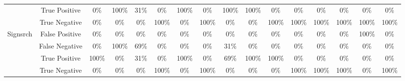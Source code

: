 \begin{table}[htb]
\begin{adjustbox}{max width=\textwidth}
\begin{tabular}{cc|ccccccccc|ccccc}
\multicolumn{1}{c|}{} & \multicolumn{1}{c||}{True Positive} & \multicolumn{1}{c|}{0\%} & \multicolumn{1}{c|}{100\%} & \multicolumn{1}{c|}{31\%} & \multicolumn{1}{c|}{0\%} & \multicolumn{1}{c|}{100\%} & \multicolumn{1}{c|}{0\%} & \multicolumn{1}{c|}{100\%} & \multicolumn{1}{c|}{100\%} & \multicolumn{1}{c|}{0\%} & \multicolumn{1}{c|}{0\%} & \multicolumn{1}{c|}{0\%} & \multicolumn{1}{c|}{0\%} & \multicolumn{1}{c|}{0\%} & 0\% \\ \cline{2-16} 
\multicolumn{1}{c|}{} & \multicolumn{1}{c||}{True Negative} & \multicolumn{1}{c|}{0\%} & \multicolumn{1}{c|}{0\%} & \multicolumn{1}{c|}{0\%} & \multicolumn{1}{c|}{100\%} & \multicolumn{1}{c|}{0\%} & \multicolumn{1}{c|}{100\%} & \multicolumn{1}{c|}{0\%} & \multicolumn{1}{c|}{0\%} & \multicolumn{1}{c|}{100\%} & \multicolumn{1}{c|}{100\%} & \multicolumn{1}{c|}{100\%} & \multicolumn{1}{c|}{100\%} & \multicolumn{1}{c|}{100\%} & 100\% \\ \hline
\multicolumn{1}{c|}{\multirow{4}{*}{Signsrch}} & \multicolumn{1}{c||}{False Positive} & \multicolumn{1}{c|}{0\%} & \multicolumn{1}{c|}{0\%} & \multicolumn{1}{c|}{0\%} & \multicolumn{1}{c|}{0\%} & \multicolumn{1}{c|}{0\%} & \multicolumn{1}{c|}{0\%} & \multicolumn{1}{c|}{0\%} & \multicolumn{1}{c|}{0\%} & \multicolumn{1}{c|}{0\%} & \multicolumn{1}{c|}{0\%} & \multicolumn{1}{c|}{0\%} & \multicolumn{1}{c|}{0\%} & \multicolumn{1}{c|}{100\%} & 0\% \\ \cline{2-16} 
\multicolumn{1}{c|}{} & \multicolumn{1}{c||}{False Negative} & \multicolumn{1}{c|}{0\%} & \multicolumn{1}{c|}{100\%} & \multicolumn{1}{c|}{69\%} & \multicolumn{1}{c|}{0\%} & \multicolumn{1}{c|}{0\%} & \multicolumn{1}{c|}{0\%} & \multicolumn{1}{c|}{31\%} & \multicolumn{1}{c|}{0\%} & \multicolumn{1}{c|}{0\%} & \multicolumn{1}{c|}{0\%} & \multicolumn{1}{c|}{0\%} & \multicolumn{1}{c|}{0\%} & \multicolumn{1}{c|}{0\%} & 0\% \\ \cline{2-16} 
\multicolumn{1}{c|}{} & \multicolumn{1}{c||}{True Positive} & \multicolumn{1}{c|}{100\%} & \multicolumn{1}{c|}{0\%} & \multicolumn{1}{c|}{31\%} & \multicolumn{1}{c|}{0\%} & \multicolumn{1}{c|}{100\%} & \multicolumn{1}{c|}{0\%} & \multicolumn{1}{c|}{69\%} & \multicolumn{1}{c|}{100\%} & \multicolumn{1}{c|}{100\%} & \multicolumn{1}{c|}{0\%} & \multicolumn{1}{c|}{0\%} & \multicolumn{1}{c|}{0\%} & \multicolumn{1}{c|}{0\%} & 0\% \\ \cline{2-16} 
\multicolumn{1}{c|}{} & \multicolumn{1}{c||}{True Negative} & \multicolumn{1}{c|}{0\%} & \multicolumn{1}{c|}{0\%} & \multicolumn{1}{c|}{0\%} & \multicolumn{1}{c|}{100\%} & \multicolumn{1}{c|}{0\%} & \multicolumn{1}{c|}{100\%} & \multicolumn{1}{c|}{0\%} & \multicolumn{1}{c|}{0\%} & \multicolumn{1}{c|}{0\%} & \multicolumn{1}{c|}{100\%} & \multicolumn{1}{c|}{100\%} & \multicolumn{1}{c|}{100\%} & \multicolumn{1}{c|}{0\%} & 100\% \\ \hline

\end{tabular}
\end{adjustbox}
\end{table}
